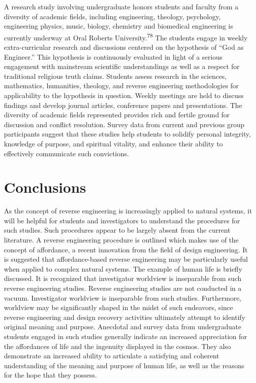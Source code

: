 A research study involving undergraduate honors students and faculty
from a diversity of academic fields, including engineering, theology,
psychology, engineering physics, music, biology, chemistry and
biomedical engineering is currently underway at Oral Roberts
University.\textsuperscript{78} The students engage in weekly
extra-curricular research and discussions centered on the hypothesis of
“God as Engineer.” This hypothesis is continuously evaluated in light
of a serious engagement with mainstream scientific understandings as
well as a respect for traditional religious truth claims. Students
assess research in the sciences, mathematics, humanities, theology, and
reverse engineering methodologies for applicability to the hypothesis
in question. Weekly meetings are held to discuss findings and develop
journal articles, conference papers and presentations. The diversity of
academic fields represented provides rich and fertile ground for
discussion and conflict resolution. Survey data from current and
previous group participants suggest that these studies help students to
solidify personal integrity, knowledge of purpose, and spiritual
vitality, and enhance their ability to effectively communicate such
convictions.

\section{Conclusions}

As the concept of reverse engineering is increasingly applied to natural
systems, it will be helpful for students and investigators to
understand the procedures for such studies. Such procedures appear to
be largely absent from the current literature. A reverse engineering
procedure is outlined which makes use of the concept of affordance, a
recent innovation from the field of design engineering. It is suggested
that affordance-based reverse engineering may be particularly useful
when applied to complex natural systems. The example of human life is
briefly discussed. It is recognized that investigator worldview is
inseparable from such reverse engineering studies. Reverse engineering
studies are not conducted in a vacuum. Investigator worldview is
inseparable from such studies. Furthermore, worldview may be
significantly shaped in the midst of such endeavors, since reverse
engineering and design recovery activities ultimately attempt to
identify original meaning and purpose. Anecdotal and survey data from
undergraduate students engaged in such studies generally indicate an
increased appreciation for the affordances of life and the ingenuity
displayed in the cosmos. They also demonstrate an increased ability to
articulate a satisfying and coherent understanding of the meaning and
purpose of human life, as well as the reasons for the hope that they
possess.


